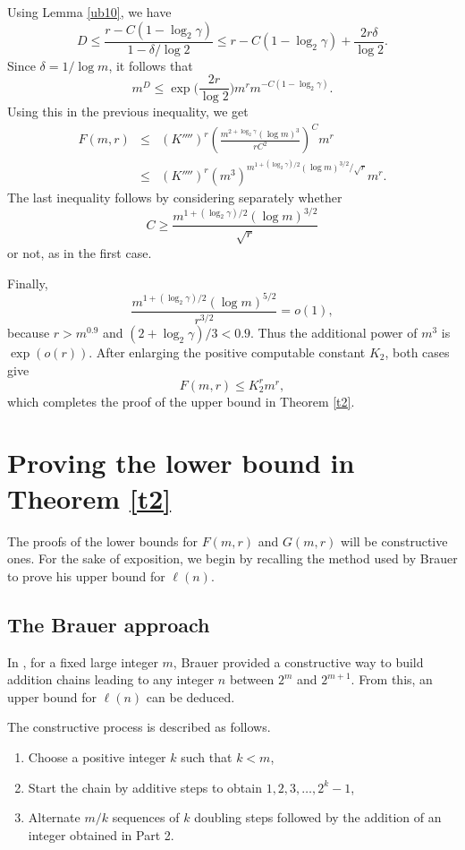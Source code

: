 \documentclass{article}
\theoremstyle{definition}
\begin{document}
Using Lemma \ref{ub10}, we have
$$
D\le
\frac{r-C(1-\log_2\gamma)}{1-\delta/\log 2}
\le
r-C(1-\log_2\gamma)+\frac{2r\delta}{\log 2}.
$$
Since $\delta=1/\log m$, it follows that
$$
m^D\le
\exp\Big(\frac{2r}{\log 2}\Big)
m^r m^{-C(1-\log_2\gamma)}.
$$
Using this in the previous inequality, we get
\begin{eqnarray*}
F(m,r)&\le&(K'''')^r \left(\frac{m^{2+\log_2\gamma}(\log m)^{3}}{rC^2}\right)^Cm^r\\
&\le& (K'''')^r(m^3)^{
m^{1+(\log_2\gamma)/2}(\log m)^{3/2}/\sqrt r
}
m^r.
\end{eqnarray*}
The last inequality follows by considering separately whether
$$
C\ge
\frac{m^{1+(\log_2\gamma)/2}(\log m)^{3/2}}{\sqrt r}
$$
or not, as in the first case.

Finally,
$$
\frac{
m^{1+(\log_2\gamma)/2}(\log m)^{5/2}
}{r^{3/2}}
=o(1),
$$
because $r>m^{0.9}$ and $(2+\log_2\gamma)/3<0.9$.
Thus the additional power of $m^3$ is $\exp(o(r))$.
After enlarging the positive computable constant $K_2$,
both cases give
$$
F(m,r)\le K_2^r m^r,
$$
which completes the proof of the upper bound in
Theorem \ref{t2}.


\section{Proving the lower bound in Theorem \ref{t2}}

The proofs of the lower bounds for $F(m,r)$ and $G(m,r)$ will be constructive ones.   For the sake of  exposition, we begin by recalling the method used by Brauer to prove his upper bound for $\ell(n)$.

\subsection{The Brauer approach}

In \cite{brauer}, for a fixed large integer $m$, Brauer provided a constructive way to build addition chains leading to any integer $n$  between $2^m$ and $2^{m+1}$. From this, an upper bound for $\ell(n)$ can be deduced.

The constructive process is described as follows.

\begin{enumerate}
\item Choose a positive integer $k$ such that $k<m$,
\item Start the chain by additive steps to obtain $1,2,3,\ldots, 2^k-1$,
\item Alternate $m/k$ sequences of $k$ doubling steps followed by the addition of an integer obtained in Part 2.
\end{enumerate}
\end{document}
